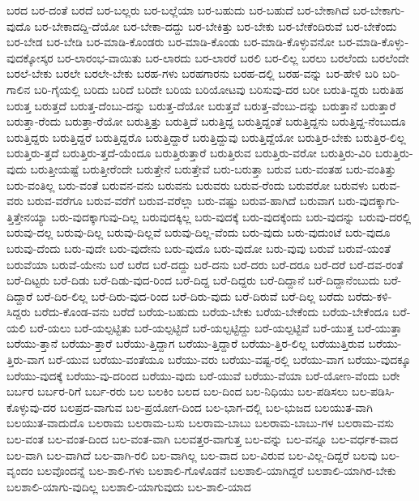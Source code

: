 {ಬರದ
ಬರ-ದಂತೆ
ಬರದೆ
ಬರ-ಬಲ್ಲರು
ಬರ-ಬಲ್ಲೆಯಾ
ಬರ-ಬಹುದು
ಬರ-ಬಹುದೆ
ಬರ-ಬೇಕಾಗಿದೆ
ಬರ-ಬೇಕಾಗು-ವುದೊ
ಬರ-ಬೇಕಾದದ್ದಿ-ದೆಯೋ
ಬರ-ಬೇಕಾ-ದದ್ದು
ಬರ-ಬೇಕಿತ್ತು
ಬರ-ಬೇಕು
ಬರ-ಬೇಕೆಂದಿರುವೆ
ಬರ-ಬೇಕೆಂದು
ಬರ-ಬೇಡ
ಬರ-ಬೇಡಿ
ಬರ-ಮಾಡಿ-ಕೊಂಡರು
ಬರ-ಮಾಡಿ-ಕೊಂಡು
ಬರ-ಮಾಡಿ-ಕೊಳ್ಳುವನೋ
ಬರ-ಮಾಡಿ-ಕೊಳ್ಳು-ವುದಕ್ಕೋಸ್ಕರ
ಬರ-ಲಾರಂಭ-ವಾಯಿತು
ಬರ-ಲಾರದು
ಬರ-ಲಾರರೆ
ಬರಲಿ
ಬರ-ಲಿಲ್ಲ
ಬರಲು
ಬರಲೆಂದು
ಬರಲೆಂದೇ
ಬರಲೆ-ಬೇಕು
ಬರಲೇ
ಬರಲೇ-ಬೇಕು
ಬರಹ-ಗಳು
ಬರಹಗಾರನು
ಬರಹ-ದಲ್ಲಿ
ಬರಹ-ವನ್ನು
ಬರ-ಹೇಳಿ
ಬರಿ
ಬರಿ-ಗಾಲಿನ
ಬರಿ-ಗೈಯಲ್ಲಿ
ಬರಿದು
ಬರಿದೆ
ಬರಿದೇ
ಬರಿಯ
ಬರಿಯೋಟವು
ಬರಿಸುವು-ದರ
ಬರೀ
ಬರುತಿ-ದ್ದರು
ಬರುತಿಹ
ಬರುತ್ತ
ಬರುತ್ತದೆ
ಬರುತ್ತ-ದೆಂಬು-ದನ್ನು
ಬರುತ್ತ-ದೆಯೋ
ಬರುತ್ತವೆ
ಬರುತ್ತ-ವೆಂಬು-ದನ್ನು
ಬರುತ್ತಾನೆ
ಬರುತ್ತಾರೆ
ಬರುತ್ತಾ-ರೆಂದು
ಬರುತ್ತಾ-ರೆಯೋ
ಬರುತ್ತಿತ್ತು
ಬರುತ್ತಿದೆ
ಬರುತ್ತಿದ್ದ
ಬರುತ್ತಿದ್ದಂತೆ
ಬರುತ್ತಿದ್ದನು
ಬರುತ್ತಿದ್ದ-ನೆಂಬುದೂ
ಬರುತ್ತಿದ್ದರು
ಬರುತ್ತಿದ್ದರೆ
ಬರುತ್ತಿದ್ದರೊ
ಬರುತ್ತಿದ್ದಾರೆ
ಬರುತ್ತಿದ್ದುವು
ಬರುತ್ತಿದ್ದೆಯೋ
ಬರುತ್ತಿರ-ಬೇಕು
ಬರುತ್ತಿರ-ಲಿಲ್ಲ
ಬರುತ್ತಿರು-ತ್ತದೆ
ಬರುತ್ತಿರು-ತ್ತದೆ-ಯೆಂದೂ
ಬರುತ್ತಿರುತ್ತಾರೆ
ಬರುತ್ತಿರುವ
ಬರುತ್ತಿರು-ವರೋ
ಬರುತ್ತಿರು-ವಿರಿ
ಬರುತ್ತಿರು-ವುದು
ಬರುತ್ತೀಯಷ್ಟೆ
ಬರುತ್ತೀರೆಂದೇ
ಬರುತ್ತೇನೆ
ಬರುತ್ತೇವೆ
ಬರು-ಬರುತ್ತಾ
ಬರುವ
ಬರು-ವಂತಹ
ಬರು-ವಂತಿತ್ತು
ಬರು-ವಂತಿಲ್ಲ
ಬರು-ವಂತೆ
ಬರುವನ-ವನು
ಬರುವನು
ಬರುವರು
ಬರುವ-ರೆಂದು
ಬರುವರೋ
ಬರುವಳು
ಬರುವ-ವರು
ಬರುವ-ವರೆಗೂ
ಬರುವ-ವರೆಗೆ
ಬರುವ-ವರೆಲ್ಲಾ
ಬರು-ವಷ್ಟು
ಬರುವ-ಹಾಗಿದೆ
ಬರುವಾಗ
ಬರು-ವುದಕ್ಕಾಗು-ತ್ತಿತ್ತೇನಯ್ಯಾ
ಬರು-ವುದಕ್ಕಾಗುವು-ದಿಲ್ಲ
ಬರುವುದಕ್ಕಿಲ್ಲ
ಬರು-ವುದಕ್ಕೆ
ಬರು-ವುದಕ್ಕೆಂದು
ಬರು-ವುದನ್ನು
ಬರುವು-ದರಲ್ಲಿ
ಬರುವು-ದಲ್ಲ
ಬರುವು-ದಿಲ್ಲ
ಬರುವು-ದಿಲ್ಲವೆ
ಬರುವು-ದಿಲ್ಲ-ವೆಂದು
ಬರು-ವುದು
ಬರು-ವುದುಂಟೆ
ಬರು-ವುದೂ
ಬರುವು-ದೆಂದು
ಬರು-ವುದೇ
ಬರು-ವುದೇನು
ಬರು-ವುದೊ
ಬರು-ವುದೋ
ಬರು-ವುವು
ಬರುವೆ
ಬರುವೆ-ಯಂತೆ
ಬರುವೆಯಾ
ಬರುವೆ-ಯೇನು
ಬರೆ
ಬರೆದ
ಬರೆ-ದದ್ದು
ಬರೆ-ದನು
ಬರೆ-ದರು
ಬರೆ-ದರೂ
ಬರೆ-ದರೆ
ಬರೆ-ದವ-ರಂತೆ
ಬರೆ-ದಿಟ್ಟರು
ಬರೆ-ದಿಡು
ಬರೆ-ದಿಡು-ವುದ-ರಿಂದ
ಬರೆ-ದಿದ್ದ
ಬರೆ-ದಿದ್ದರು
ಬರೆ-ದಿದ್ದಾನೆ
ಬರೆ-ದಿದ್ದಾನೆಂಬುದು
ಬರೆ-ದಿದ್ದಾರೆ
ಬರೆ-ದಿರ-ಲಿಲ್ಲ
ಬರೆ-ದಿರು-ವುದ-ರಿಂದ
ಬರೆ-ದಿರು-ವುದು
ಬರೆ-ದಿರುವೆ
ಬರೆ-ದಿಲ್ಲ
ಬರೆದು
ಬರೆದು-ಕಳಿ-ಸಿದ್ದರು
ಬರೆದು-ಕೊಂಡ-ವನು
ಬರೆದೆ
ಬರೆಯ-ಬಹುದು
ಬರೆಯ-ಬೇಕು
ಬರೆಯ-ಬೇಕೆಂದು
ಬರೆಯ-ಬೇಕೆಂದೂ
ಬರೆ-ಯಲಿ
ಬರೆ-ಯಲು
ಬರೆ-ಯಲ್ಪಟ್ಟಿತು
ಬರೆ-ಯಲ್ಪಟ್ಟಿದೆ
ಬರೆ-ಯಲ್ಪಟ್ಟಿದ್ದು
ಬರೆ-ಯಲ್ಪಟ್ಟಿವೆ
ಬರೆ-ಯುತ್ತ
ಬರೆ-ಯುತ್ತಾ
ಬರೆಯು-ತ್ತಾನೆ
ಬರೆಯು-ತ್ತಾರೆ
ಬರೆಯು-ತ್ತಿದ್ದಾಗ
ಬರೆಯು-ತ್ತಿದ್ದಾರೆ
ಬರೆಯು-ತ್ತಿರ-ಲಿಲ್ಲ
ಬರೆಯುತ್ತಿರುವ
ಬರೆಯು-ತ್ತಿರು-ವಾಗ
ಬರೆ-ಯುವ
ಬರೆಯು-ವಂತೆಯೂ
ಬರೆಯು-ವರು
ಬರೆಯು-ವಷ್ಟ-ರಲ್ಲಿ
ಬರೆಯು-ವಾಗ
ಬರೆಯು-ವುದಕ್ಕೂ
ಬರೆಯು-ವುದಕ್ಕೆ
ಬರೆಯು-ವು-ದರಿಂದ
ಬರೆಯು-ವುದು
ಬರೆ-ಯುವೆ
ಬರೆಯು-ವೆಯಾ
ಬರೆ-ಯೋಣ-ವೆಂದು
ಬರೇ
ಬರ್ಬರ
ಬರ್ಬರ-ರಿಗೆ
ಬರ್ಬ-ರರು
ಬಲ
ಬಲಕಿಂ
ಬಲದ
ಬಲ-ದಿಂದ
ಬಲ-ನಿಧಿಯು
ಬಲ-ಪಡಿಸಲು
ಬಲ-ಪಡಿಸಿ-ಕೊಳ್ಳುವು-ದರ
ಬಲಪ್ರದ-ವಾಗುವ
ಬಲ-ಪ್ರಯೋಗ-ದಿಂದ
ಬಲ-ಭಾಗ-ದಲ್ಲಿ
ಬಲ-ಭುಜದ
ಬಲಯುತ-ವಾಗಿ
ಬಲಯುತ-ವಾದುದೊ
ಬಲರಾಮ
ಬಲರಾಮ-ಬಸು
ಬಲರಾಮ-ಬಾಬು
ಬಲರಾಮ-ಬಾಬು-ಗಳ
ಬಲರಾಮ-ವಸು
ಬಲ-ವಂತ
ಬಲ-ವಂತ-ದಿಂದ
ಬಲ-ವಂತ-ವಾಗಿ
ಬಲವತ್ತರ-ವಾಗುತ್ತ
ಬಲ-ವನ್ನು
ಬಲ-ವನ್ನೂ
ಬಲ-ವರ್ಧಕ-ವಾದ
ಬಲ-ವಾಗಿ
ಬಲ-ವಾಗಿದೆ
ಬಲ-ವಾಗಿ-ರಲಿ
ಬಲ-ವಾಗಿಲ್ಲ
ಬಲ-ವಾದ
ಬಲ-ವಿರುವ
ಬಲ-ವಿಲ್ಲ-ದಿದ್ದರೆ
ಬಲವು
ಬಲ-ವೃಂದಂ
ಬಲವೊಂದನ್ನೆ
ಬಲ-ಶಾಲಿ-ಗಳು
ಬಲಶಾಲಿ-ಗೊಳೊಡನೆ
ಬಲಶಾಲಿ-ಯಾಗಿದ್ದರೆ
ಬಲಶಾಲಿ-ಯಾಗಿರ-ಬೇಕು
ಬಲಶಾಲಿ-ಯಾಗು-ವುದಿಲ್ಲ
ಬಲಶಾಲಿ-ಯಾಗುವುದು
ಬಲ-ಶಾಲಿ-ಯಾದ
}
